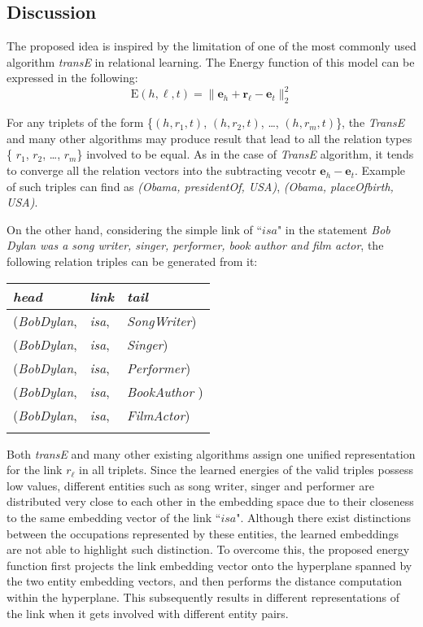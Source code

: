 \documentclass[9pt]{sig-alternate-05-2015}
\begin{document}
\subsection{Discussion}
The proposed idea is inspired by the limitation of one of the most commonly used algorithm \emph{transE} \cite{bordes_translating_2013}  in relational learning. The Energy function of this model can be expressed in the following:
\begin{equation}
\mathrm{E}{(h,\ell, t)} = \|\bm{e}_h + \bm{r}_{\ell}-\bm{e}_t\|_2^2
\end{equation}

For any triplets of the form \{$(h, r_1, t)$, $(h, r_2, t)$, \ldots, $(h, r_m, t)$\}, the \emph{TransE}  and many other algorithms may produce result that lead to all the relation types  \{ $r_1$, $r_2$, \ldots, $r_m$\} involved to be equal. As in the case of \emph{TransE} algorithm, it tends to converge all the relation vectors into the subtracting vecotr  $\bm{e}_h - \bm{e}_t$.  Example of such triples can find as  \emph{(Obama, presidentOf, USA)}, \emph{(Obama, placeOfbirth, USA)}.

 On the other hand, considering the simple link of ``$isa$" in  the statement \emph{Bob Dylan was a song writer, singer, performer, book author and film actor}, the following relation triples can be generated from it:
\\
\begin{tabular}[center]{l l l} 
 \\
 \emph{head} & \emph{link} & \emph{tail} \\
 \hline 
 (\emph{BobDylan}, & \emph{isa}, & \emph{SongWriter}) \\
 (\emph{BobDylan}, & \emph{isa}, & \emph{Singer}) \\
  (\emph{BobDylan}, & \emph{isa}, & \emph{Performer}) \\
   (\emph{BobDylan}, & \emph{isa}, & \emph{BookAuthor }) \\
    (\emph{BobDylan}, & \emph{isa}, & \emph{FilmActor}) \\\\
 \end{tabular}
 
Both \emph{transE} and many other existing algorithms assign one unified representation for the link $r_{\ell}$ in all triplets.  Since the learned energies of the valid triples  possess low values,  different entities such as song writer, singer and performer are  distributed very close to each other in the embedding space due to their closeness to the same embedding vector of  the link ``$isa$". Although there exist distinctions between the occupations represented by these entities, the learned embeddings are not able to highlight such distinction. To overcome this,  the proposed energy function  first projects the link embedding vector onto the hyperplane spanned by the two  entity embedding vectors, and then performs the distance computation within the hyperplane.  This subsequently results in different representations of the link when it gets involved with different entity pairs.  
\end{document}
